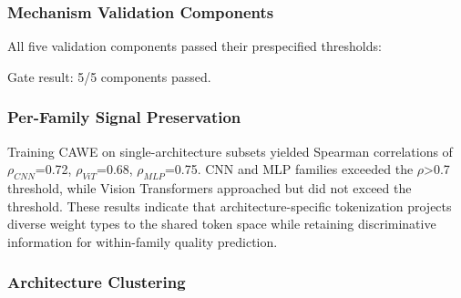 
\subsubsection{Mechanism Validation Components}

All five validation components passed their prespecified thresholds:

\begin{table}[htbp]
\centering
{}
\end{table}

Gate result: 5/5 components passed.

\subsubsection{Per-Family Signal Preservation}

Training CAWE on single-architecture subsets yielded Spearman correlations of $\rho_{CNN}$=0.72, $\rho_{ViT}$=0.68, $\rho_{MLP}$=0.75. CNN and MLP families exceeded the $\rho$>0.7 threshold, while Vision Transformers approached but did not exceed the threshold. These results indicate that architecture-specific tokenization projects diverse weight types to the shared token space while retaining discriminative information for within-family quality prediction.

\subsubsection{Architecture Clustering}

